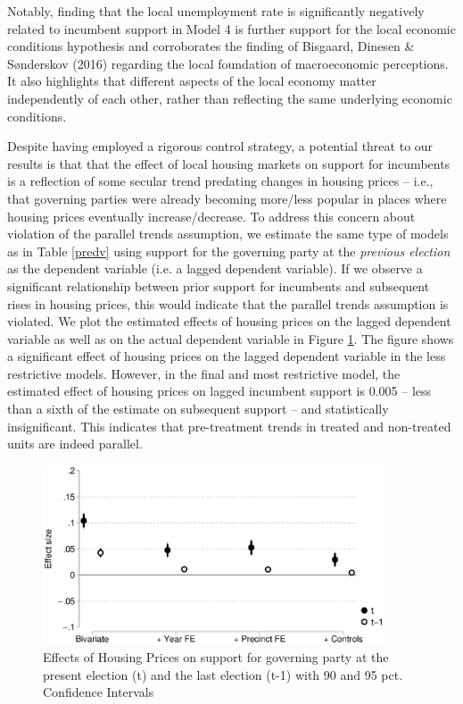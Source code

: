 \documentclass[12pt,a4paper]{article}
\begin{document}
	Notably, finding that the local unemployment rate is significantly negatively related to incumbent support in Model 4 is further support for the local economic conditions hypothesis and corroborates the finding of Bisgaard, Dinesen \& Sønderskov (2016) regarding the local foundation of macroeconomic perceptions. It also highlights that different aspects of the local economy matter independently of each other, rather than reflecting the same underlying economic conditions.
	
	Despite having employed a rigorous control strategy, a potential threat to our results is that that the effect of local housing markets on support for incumbents is a reflection of some secular trend predating changes in housing prices -- i.e., that governing parties were already becoming more/less popular in places where housing prices eventually increase/decrease. To address this concern about violation of the parallel trends assumption, we estimate the same type of models as in Table \ref{predv} using support for the governing party at the \textit{previous election} as the dependent variable (i.e. a lagged dependent variable). If we observe a significant relationship between prior support for incumbents and subsequent rises in housing prices, this would indicate that the parallel trends assumption is violated. We plot the estimated effects of housing prices on the lagged dependent variable as well as on the actual dependent variable in Figure \ref{placebo}. The figure shows a significant effect of housing prices on the lagged dependent variable in the less restrictive models. However, in the final and most restrictive model, the estimated effect of housing prices on lagged incumbent support is 0.005 -- less than a sixth of the estimate on subsequent support -- and statistically insignificant. This indicates that pre-treatment trends in treated and non-treated units are indeed parallel.
	
	\begin{figure}[htbp!]
		\includegraphics[width=0.9\textwidth]{../figures/lagdv.eps}
		\centering
		\caption{Effects of Housing Prices on support for governing party at the present election (t) and the last election (t-1) with 90  and 95 pct. Confidence Intervals}\label{placebo}
	\end{figure}
	
\end{document}
